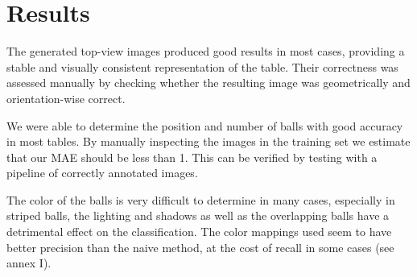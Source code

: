 \section{Results}
\label{sec:results}

The generated top-view images produced good results in most cases, providing a stable and visually consistent representation of the table. Their correctness was assessed manually by checking whether the resulting image was geometrically and orientation-wise correct.

We were able to determine the position and number of balls with good accuracy in most tables. By manually inspecting the images in the training set we estimate that our MAE should be less than 1. This can be verified by testing with a pipeline of correctly annotated images.

The color of the balls is very difficult to determine in many cases, especially in striped balls, the lighting and shadows as well as the overlapping balls have a detrimental effect on the classification. The color mappings used seem to have better precision than the naive method, at the cost of recall in some cases (see annex I).
